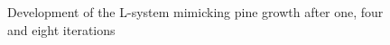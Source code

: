 \begin{figure}
\makebox[\textwidth]{\framebox[10cm]{\rule{0pt}{250pt}}}     
\caption{Development  of the  L-system mimicking pine growth 
         after one, four and eight iterations}\label{fig:pine}
\end{figure}

